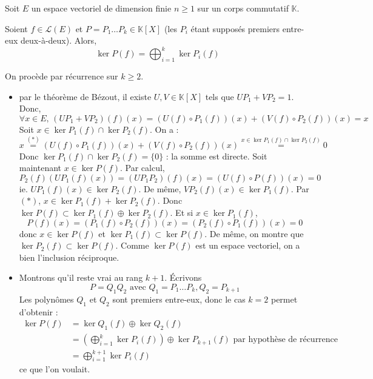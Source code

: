 





	Soit $E$ un espace vectoriel de dimension finie $n \geq 1$ sur un corps commutatif $\mathbb{K}$.

	\begin{lemma}
		\label{lemme-des-noyaux-1}
		Soient $f \in \mathcal{L}(E)$ et $P = P_1 \dots P_k \in \mathbb{K}[X]$ (les $P_i$ étant supposés premiers entre-eux deux-à-deux). Alors,
		\[ \ker{P(f)} = \bigoplus_{i = 1}^k \ker{P_i(f)} \]
	\end{lemma}

	\begin{demonstration}
		On procède par récurrence sur $k \geq 2$.
		\begin{itemize}
			\item {} par le théorème de Bézout, il existe $U, V \in \mathbb{K}[X]$ tels que $UP_1 + VP_2 = 1$. Donc,
			\[ \forall x \in E, \, (UP_1 + VP_2)(f)(x) = (U(f) \circ P_1(f))(x) + (V(f) \circ P_2(f))(x) = x \tag{$*$} \]
			Soit $x \in \ker{P_1(f)} \cap \ker{P_2(f)}$. On a :
			\[ x \overset{(*)}{=} (U(f) \circ P_1(f))(x) + (V(f) \circ P_2(f))(x) \overset{x \in \ker{P_1(f)} \cap \ker{P_2(f)}}{=} 0 \]
			Donc $\ker{P_1(f)} \cap \ker{P_2(f)} = \{ 0 \}$ : la somme est directe.
			\newpar
			Soit maintenant $x \in \ker{P(f)}$. Par calcul,
			\[ P_2(f)(UP_1(f)(x)) = (UP_1P_2)(f)(x) = (U(f) \circ P(f))(x) = 0 \]
			ie. $UP_1(f)(x) \in \ker{P_2(f)}$. De même, $VP_2(f)(x) \in \ker{P_1(f)}$. Par $(*)$, $x \in \ker{P_1(f)} + \ker{P_2(f)}$. Donc $\ker{P(f)} \subset \ker{P_1(f)} \oplus \ker{P_2(f)}$.
			\newpar
			Et si $x \in \ker{P_1(f)}$,
			\[ P(f)(x) = (P_1(f) \circ P_2(f))(x) = (P_2(f) \circ P_1(f))(x) = 0 \]
			donc $x \in \ker{P(f)}$ et $\ker{P_1}(f) \subset \ker{P(f)}$. De même, on montre que $\ker{P_2}(f) \subset \ker{P(f)}$. Comme $\ker{P(f)}$ est un espace vectoriel, on a bien l'inclusion réciproque.
			\item {} Montrons qu'il reste vrai au rang $k+1$. Écrivons
			\[ P = Q_1Q_2 \text{ avec } Q_1 = P_1 \dots P_k, Q_2 = P_{k+1} \]
			Les polynômes $Q_1$ et $Q_2$ sont premiers entre-eux, donc le cas $k = 2$ permet d'obtenir :
			\begin{align*}
				\ker{P(f)} &= \ker{Q_1(f)} \oplus \ker{Q_2(f)} \\
				&= \left( \bigoplus_{i = 1}^k \ker{P_i(f)} \right) \oplus \ker{P_{k+1}(f)} \text{ par hypothèse de récurrence} \\
				&= \bigoplus_{i = 1}^{k+1} \ker{P_i(f)}
			\end{align*}
			ce que l'on voulait.
		\end{itemize}
	\end{demonstration}

